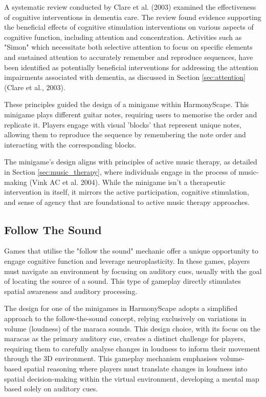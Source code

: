 \documentclass{l4proj}
\begin{document}
A systematic review conducted by Clare et al. (2003) examined the effectiveness of cognitive interventions in dementia care. The review found evidence supporting the beneficial effects of cognitive stimulation interventions on various aspects of cognitive function, including attention and concentration. Activities such as "Simon" which necessitate both selective attention to focus on specific elements and sustained attention to accurately remember and reproduce sequences, have been identified as potentially beneficial interventions for addressing the attention impairments associated with dementia, as discussed in Section \ref{sec:attention} (Clare et al., 2003).

These principles guided the design of a minigame within HarmonyScape. This minigame plays different guitar notes, requiring users to memorise the order and replicate it. Players engage with visual 'blocks' that represent unique notes, allowing them to reproduce the sequence by remembering the note order and interacting with the corresponding blocks.

The minigame's design aligns with principles of active music therapy, as detailed in Section \ref{sec:music_therapy}, where individuals engage in the process of music-making (Vink AC et al. 2004).  While the minigame isn't a therapeutic intervention in itself, it mirrors the active participation, cognitive stimulation, and sense of agency that are foundational to active music therapy approaches.

\subsection{Follow The Sound}
Games that utilise the "follow the sound" mechanic offer a unique opportunity to engage cognitive function and leverage neuroplasticity. In these games, players must navigate an environment by focusing on auditory cues, usually with the goal of locating the source of a sound. This type of gameplay directly stimulates spatial awareness and auditory processing.

The design for one of the minigames in HarmonyScape adopts a simplified approach to the follow-the-sound concept, relying exclusively on variations in volume (loudness) of the maraca sounds. This design choice, with its focus on the maracas as the primary auditory cue, creates a distinct challenge for players, requiring them to carefully analyse changes in loudness to inform their movement through the 3D environment. This gameplay mechanism emphasises volume-based spatial reasoning where players must translate changes in loudness into spatial decision-making within the virtual environment, developing a mental map based solely on auditory cues.
\end{document}
